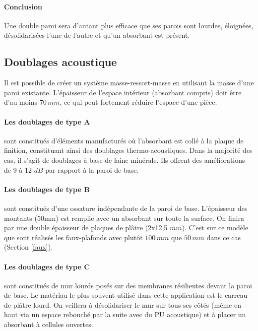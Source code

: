 \documentclass[11pt]{report}
\begin{document}
\paragraph{Conclusion} Une double paroi sera d'autant plus efficace que ses parois sont lourdes, éloignées, désolidarisées l'une de l'autre et qu'un absorbant est présent.



\subsection{Doublages acoustique}
Il est possible de créer un système masse-ressort-masse en utilisant la masse d'une paroi existante. L'épaisseur de l'espace intérieur (absorbant compris) doit être d'au moins $70\,mm$, ce qui peut fortement réduire l'espace d'une pièce.

\paragraph{Les doublages de type A} sont constitués d'éléments manufacturés où l'absorbant est collé à la plaque de finition, constituant ainsi des doublages thermo-acoustiques. Dans la majorité des cas, il s'agit de doublages à base de laine minérale. Ils offrent des améliorations de 9 à 12 $dB$ par rapport à la paroi de base.

\paragraph{Les doublages de type B} sont constitués d'une ossature indépendante de la paroi de base. L'épaisseur des montants (50mm) est remplie avec un absorbant sur toute la surface. On finira par une double épaisseur de plaques de plâtre (2x12,5 $mm$).
C'est sur ce modèle que sont réalisés les faux-plafonds avec plutôt $100\,mm$ que $50\,mm$ dans ce cas (Section \ref{faux}).


\paragraph{Les doublages de type C} sont constitués de mur lourds posés sur des membranes résilientes devant la paroi de base. Le matériau le plus souvent utilisé dans cette application est le carreau de plâtre lourd. On veillera à désolidariser le mur sur tous ses côtés (même en haut via un espace rebouché par la suite avec du PU acoustique) et à placer un absorbant à cellules ouvertes.\\
\end{document}
